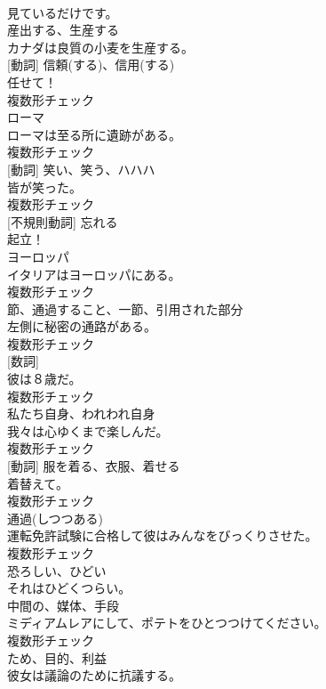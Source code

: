 \documentclass[8pt]{extreport}
\begin{document}
\begin{CJK}{UTF8}{min}
\\	見ているだけです。	
\\	[動詞]	産出する、生産する	
\\	カナダは良質の小麦を生産する。	
\\	[名詞] [動詞]	信頼(する)、信用(する)	
\\	任せて！	
\\	複数形チェック
\\	[名詞]	ローマ	
\\	ローマは至る所に遺跡がある。	
\\	複数形チェック
\\	[名詞] [動詞]	笑い、笑う、ハハハ	
\\	皆が笑った。	
\\	複数形チェック
\\	[動詞] [不規則動詞]	忘れる	
\\	起立！	
\\	[名詞]	ヨーロッパ	
\\	イタリアはヨーロッパにある。	
\\	複数形チェック
\\	[名詞]	節、通過すること、一節、引用された部分	
\\	左側に秘密の通路がある。	
\\	複数形チェック
\\	[名詞] [数詞]	
\\	彼は８歳だ。	
\\	複数形チェック
\\	[代名詞]	私たち自身、われわれ自身	
\\	我々は心ゆくまで楽しんだ。	
\\	複数形チェック
\\	[名詞] [動詞]	服を着る、衣服、着せる	
\\	着替えて。	
\\	複数形チェック
\\	[名詞]	通過(しつつある)	
\\	運転免許試験に合格して彼はみんなをびっくりさせた。	
\\	複数形チェック
\\	[形容詞]	恐ろしい、ひどい	
\\	それはひどくつらい。	
\\	[名詞]	中間の、媒体、手段	
\\	ミディアムレアにして、ポテトをひとつつけてください。	
\\	複数形チェック
\\	[名詞]	ため、目的、利益	
\\	彼女は議論のために抗議する。	

\end{CJK}
\end{document}
